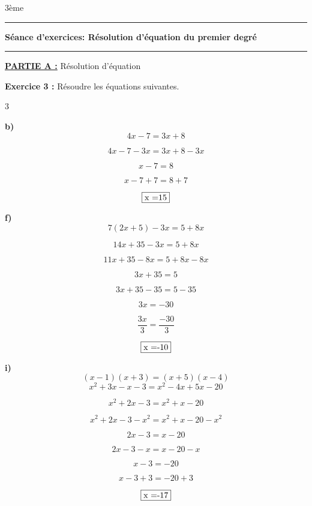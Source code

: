 \documentclass[a4paper,11pt]{article}
\newcommand{\bmul}[1]{\begin{multicols}{#1}}
\newcommand{\emul}{\end{multicols}}
\newcounter{enumtaba}
\newcommand{\initqa}{\setcounter{enumtaba}{0}}
\newcommand{\titre}[5] 
{
\noindent #2 \hfill #4 \\
#3 \hfill #5

\vspace{-1.6cm}

\begin{center}\rule{6cm}{0.5mm}\end{center}
\vspace{0.2cm}
\begin{center}{\large{\textbf{#1}}}\end{center}
\begin{center}\rule{6cm}{0.5mm}\end{center}
}
\begin{document}
\pagestyle{empty}
\titre{Séance d'exercices: Résolution d'équation du premier degré}{}{}{3ème}{}

\vspace*{0.2cm}


{\large \textbf{\underline{PARTIE A :}}  Résolution d'équation}\\

\vspace*{0.25cm}


\textbf{Exercice 3 :}
Résoudre les équations suivantes.


\bmul{3}
\initqa 



\textbf{b)} $$4x-7 = 3x+8$$

\color{red}
$$ 4x -7-3x = 3x+8 -3x$$

$$x-7  =  8$$

$$x-7+ 7 =  8+7$$

$$\fbox{x =15}$$
\color{black}






\columnbreak

\textbf{f)} $$7(2x+5) - 3x = 5 + 8x $$

\color{red}
$$ 14x +35 -3x= 5+8x$$

$$11x+35-8x= 5+8x-8x$$

$$3x+35= 5$$

$$3x+35-35= 5-35$$

$$3x = -30$$

$$\dfrac{3x}{3}= \dfrac{-30}{3}$$

$$\fbox{x =-10}$$
\color{black}


\columnbreak


\textbf{i)} $$( x - 1)( x + 3) = ( x + 5)( x - 4) $$
\color{red}
 $$x^{2} +3x-x-3 = x^{2}-4x+5x-20 $$

 $$x^{2} +2x-3 = x^{2}+x-20 $$
 
  $$x^{2} +2x-3 -x^{2} = x^{2}+x-20 -x^{2}$$
  
   $$ 2x-3 = x-20 $$
   
    $$ 2x-3-x = x-20-x $$
    
     $$ x-3 =-20 $$
   
 $$ x-3+3 =-20+3$$
 
 
$$\fbox{x =-17}$$

\emul







 
\end{document}
